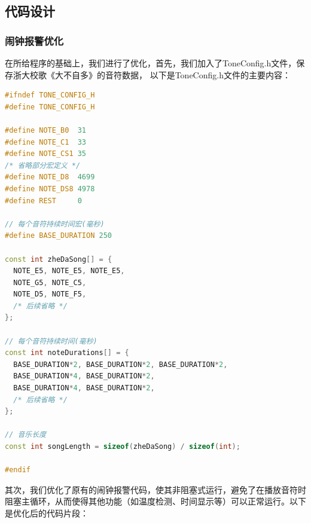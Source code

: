 \documentclass[10.5pt]{config}
\begin{document}
\subsection{代码设计}
\subsubsection{闹钟报警优化}
在所给程序的基础上，我们进行了优化，首先，我们加入了ToneConfig.h文件，保存浙大校歌《大不自多》的音符数据，
以下是ToneConfig.h文件的主要内容：
\begin{lstlisting}[language=C++, caption=Arduino数字时钟音符配置文件]
#ifndef TONE_CONFIG_H
#define TONE_CONFIG_H

#define NOTE_B0  31
#define NOTE_C1  33
#define NOTE_CS1 35
/* 省略部分宏定义 */
#define NOTE_D8  4699
#define NOTE_DS8 4978
#define REST     0

// 每个音符持续时间宏(毫秒)
#define BASE_DURATION 250

const int zheDaSong[] = {
  NOTE_E5, NOTE_E5, NOTE_E5, 
  NOTE_G5, NOTE_C5, 
  NOTE_D5, NOTE_F5, 
  /* 后续省略 */
};

// 每个音符持续时间(毫秒)
const int noteDurations[] = {
  BASE_DURATION*2, BASE_DURATION*2, BASE_DURATION*2, 
  BASE_DURATION*4, BASE_DURATION*2, 
  BASE_DURATION*4, BASE_DURATION*2,
  /* 后续省略 */
};

// 音乐长度
const int songLength = sizeof(zheDaSong) / sizeof(int);

#endif
\end{lstlisting}

\clearpage
其次，我们优化了原有的闹钟报警代码，使其非阻塞式运行，避免了在播放音符时阻塞主循环，从而使得其他功能（如温度检测、时间显示等）可以正常运行。以下是优化后的代码片段：
\end{document}

